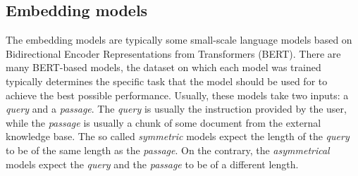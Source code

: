 \subsection{Embedding models}

The embedding models are typically some small-scale language models based on Bidirectional Encoder Representations from Transformers (BERT). There are many BERT-based models, the dataset on which each model was trained typically determines the specific task that the model should be used for to achieve the best possible performance. Usually, these models take two inputs: a \textit{query} and a \textit{passage}. The \textit{query} is usually the instruction provided by the user, while the \textit{passage} is usually a chunk of some document from the external knowledge base. The so called \textit{symmetric} models expect the length of the \textit{query} to be of the same length as the \textit{passage}. On the contrary, the \textit{asymmetrical} models expect the \textit{query} and the \textit{passage} to be of a different length.